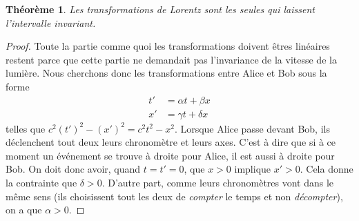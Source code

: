 \documentclass[a4paper,12pt]{book}
\newcounter{numtho}
\theoremstyle{mes_exemples}	\newtheorem{exemple}[numtho]{Exemple}
\theoremstyle{mes_tho}
\newtheorem{theorem}[numtho]{Théorème}
\begin{document}
\begin{theorem}
Les transformations de Lorentz sont les seules qui laissent l'intervalle invariant.
\end{theorem}

\begin{proof}
	Toute la partie comme quoi les transformations doivent êtres linéaires restent parce que cette partie ne demandait pas l'invariance de la vitesse de la lumière. Nous cherchons donc les transformations entre Alice et Bob sous la forme
	\[ 
	\begin{split}
		t'&=\alpha t+\beta x\\
		x'&=\gamma t+\delta x
	\end{split}  
	\]
	telles que $c^2(t')^2-(x')^2=c^2t^2-x^2$. Lorsque Alice passe devant Bob, ils déclenchent tout deux leurs chronomètre et leurs axes. C'est à dire que si à ce moment un événement se trouve à droite pour Alice, il est aussi à droite pour Bob. On doit donc avoir, quand $t=t'=0$, que $x>0$ implique $x'>0$. Cela donne la contrainte que $\delta>0$. D'autre part, comme leurs chronomètres vont dans le même sens (ils choisissent tout les deux de \emph{compter} le temps et non \emph{décompter}), on a que $\alpha>0$.


\end{proof}
\end{document}
